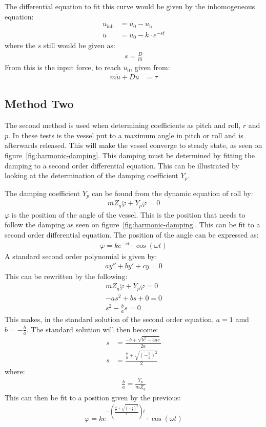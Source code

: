 The differential equation to fit this curve would be given by the inhomogeneous equation:
\begin{align}
u_{\text{inh}} &= u_0 - u_{\text{h}}\\
u &= u_0 - k \cdot e^{-st}
\end{align}
where the $s$ still would be given as:
\begin{align}
s = \frac{D}{m}
\end{align}
From this is the input force, to reach $u_0$, given from:
\begin{align}
m \dot u + Du &= \tau
\end{align}

\subsection{Method Two}
The second method is used when determining coefficients as pitch and roll, $r$ and $p$. In these tests is the vessel put to a maximum angle in pitch or roll and is afterwards released. This will make the vessel converge to steady state, as seen on figure~\vref{fig:harmonic-damping}. This damping must be determined by fitting the damping to a second order differential equation. This can be illustrated by looking at the determination of the damping coefficient $Y_p$.


The damping coefficient $Y_p$ can be found from the dynamic equation of roll by:
\begin{align}
mZ_g\ddot \varphi + Y_p\dot \varphi = 0
\end{align}
$\varphi$ is the position of the angle of the vessel. This is the position that needs to follow the damping as seen on figure~\vref{fig:harmonic-damping}. This can be fit to a second order differential equation. The position of the angle can be expressed as:
\begin{align}
\varphi = ke^{-st} \cdot \cos(\omega t)
\end{align}
A standard second order polynomial is given by:
\begin{align}
ay''+by'+cy = 0
\end{align}
This can be rewritten by the following:
\begin{align}
mZ_g\ddot \varphi + Y_p\dot \varphi = 0\\
-as^2+bs+0=0\\
s^2-\frac{b}{a}s=0
\end{align}
This makes, in the standard solution of the second order equation, $a=1$ amd $b=-\frac{b}{a}$. The standard solution will then become:
\begin{align}
s &= \frac{-b+\sqrt{b^2-4ac}}{2a}\\
s &= \frac{\frac{b}{a}+\sqrt{(-\frac{b}{a})^2}}{2}
\end{align}
where:
\begin{align}
\frac{b}{a} = \frac{Y_p}{mZ_g}
\end{align}
This can then be fit to a position given by the previous:
\begin{align}
\varphi = ke^{-\left(\frac{\frac{b}{a}+\sqrt{(-\frac{b}{a})^2}}{2}\right)t} \cdot \cos(\omega t)
\end{align}

